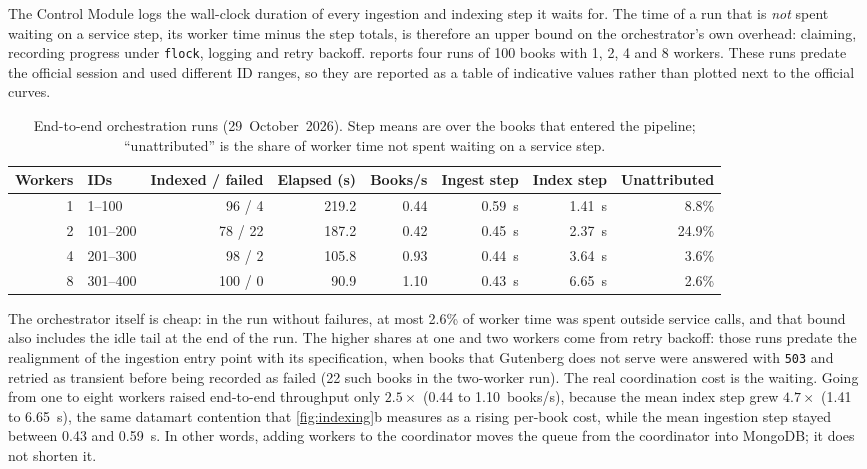 \documentclass[10pt,a4paper]{article}
\newcommand{\code}[1]{\texttt{#1}}
\begin{document}
The Control Module logs the wall-clock duration of every ingestion and
indexing step it waits for. The time of a run that is \emph{not} spent waiting
on a service step, its worker time minus the step totals, is therefore an upper
bound on the orchestrator's own overhead: claiming, recording progress under
\code{flock}, logging and retry backoff.  reports
four runs of 100 books with 1, 2, 4 and 8 workers. These runs predate the
official session and used different ID ranges, so they are reported as a table
of indicative values rather than plotted next to the official curves.

\begin{table}[htbp]
  \centering
  \footnotesize
  \caption{End-to-end orchestration runs (29~October~2026). Step
  means are over the books that entered the pipeline; ``unattributed'' is the
  share of worker time not spent waiting on a service step.}
  \label{tab:coordination-runs}
  \begin{tabular}{@{}rlrrrrrr@{}}
    \toprule
    Workers & IDs & Indexed / failed & Elapsed (s) & Books/s & Ingest step & Index step & Unattributed \\
    \midrule
    1 & 1--100   & 96 / 4   & 219.2 & 0.44 & 0.59~s & 1.41~s & 8.8\% \\
    2 & 101--200 & 78 / 22  & 187.2 & 0.42 & 0.45~s & 2.37~s & 24.9\% \\
    4 & 201--300 & 98 / 2   & 105.8 & 0.93 & 0.44~s & 3.64~s & 3.6\% \\
    8 & 301--400 & 100 / 0  & 90.9  & 1.10 & 0.43~s & 6.65~s & 2.6\% \\
    \bottomrule
  \end{tabular}
\end{table}

The orchestrator itself is cheap: in the run without failures, at most 2.6\% of
worker time was spent outside service calls, and that bound also includes the
idle tail at the end of the run. The higher shares at one and two workers come
from retry backoff: those runs predate the realignment of the ingestion entry
point with its specification, when books that Gutenberg does not serve were
answered with \code{503} and retried as transient before being recorded as
failed (22 such books in the two-worker run). The real coordination cost is the
waiting. Going from one to eight workers raised end-to-end throughput only
$2.5\times$ (0.44 to 1.10~books/s), because the mean index step grew
$4.7\times$ (1.41 to 6.65~s), the same datamart contention that
\cref{fig:indexing}b measures as a rising per-book cost, while the mean
ingestion step stayed between 0.43 and 0.59~s. In other words, adding workers
to the coordinator moves the queue from the coordinator into MongoDB; it does
not shorten it.
\end{document}
